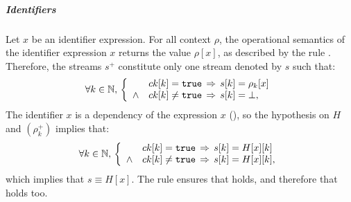 \begin{skippableproof}
    \subparagraph{Identifiers}
    Let $x$ be an identifier expression. For all context $\rho$, the operational semantics of the
    identifier expression $x$ returns the value $\rho[x]$, as described by the rule
    . Therefore, the streams $s^+$
    constitute only one stream denoted by $s$ such that:
    \begin{equation*}
        \forall k \in \mathbb{N}, \,
        \left\{
        \begin{array}{ll}
                   & ck[k] = \mathtt{{true}} \, \Rightarrow \, s[k] = \rho_k[x] \\
            \wedge & ck[k] \neq \mathtt{{true}} \, \Rightarrow \,  s[k] = \bot, \\
        \end{array}
        \right.
    \end{equation*}
    The identifier $x$ is a dependency of the expression $x$ (), so the hypothesis on $H$ and $(\rho_k^+)$ implies that:
    \begin{equation*}
        \forall k \in \mathbb{N}, \,
        \left\{
        \begin{array}{ll}
                   & ck[k] = \mathtt{{true}} \, \Rightarrow \, s[k] = H[x][k]      \\
            \wedge & ck[k] \neq \mathtt{{true}} \, \Rightarrow \,  s[k] = H[x][k], \\
        \end{array}
        \right.
    \end{equation*}
    which implies that $s \equiv H[x]$. The rule
     ensures that
     holds, and therefore that
     holds too.


\end{skippableproof}
